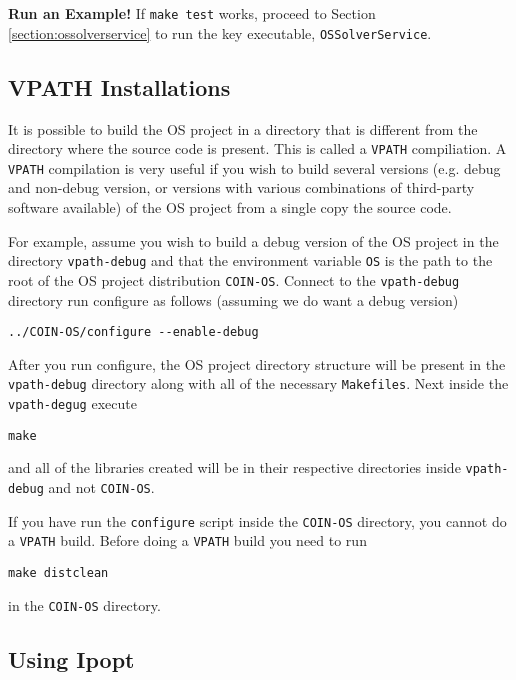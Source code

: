 \documentclass[11pt]{article}
\renewcommand{\_}{{\char"5F}}
\renewcommand{\{}{{\char"7B}}
\renewcommand{\}}{{\char"7D}}
\renewcommand{\^}{{\char"0D}}
\renewcommand{\'}{{\char"0D}}
\begin{document}
{\bf Run an Example!}  If {\tt make test} works, proceed to Section \ref{section:ossolverservice} to run the key executable, {\tt OSSolverService}.








\subsection{VPATH Installations}


It is possible to build the OS project in a directory that is different from the directory where the source code is present. This is called a {\tt VPATH}  compiliation.  A {\tt VPATH}  compilation  is very useful if you wish to build several versions (e.g. debug and non-debug version, or versions with various combinations of third-party software available) of the OS project from a single copy the source code.

For  example, assume you wish to build a debug version of the OS project in the directory {\tt vpath-debug} and that the environment variable {\tt OS} is the path to the root of the OS project distribution {\tt COIN-OS}.  Connect to the {\tt vpath-debug} directory run configure as follows (assuming we do want a debug version)

\begin{verbatim}
../COIN-OS/configure --enable-debug
\end{verbatim}

After you run configure, the OS project directory structure will be present in the {\tt vpath-debug} directory along with all of the necessary  {\tt Makefiles}.  Next inside the {\tt vpath-degug} execute

\begin{verbatim}
make
\end{verbatim}

and all of  the libraries created will be in their respective directories inside {\tt vpath-debug}  and not {\tt COIN-OS}.

\vskip 8pt
 If you have run the {\tt configure} script inside the {\tt COIN-OS} directory, you cannot do a {\tt VPATH} build. Before doing a {\tt VPATH} build you need to run
\begin{verbatim}
make distclean
\end{verbatim}
in the {\tt COIN-OS} directory.


\subsection{Using Ipopt}\label{section:ipopt}
\end{document}
